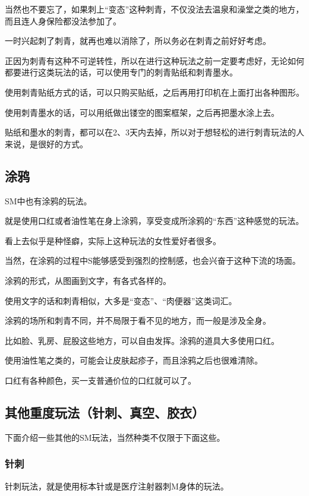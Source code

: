 \documentclass[12pt,UTF8]{ctexbook}
\begin{document}
当然也不要忘了，如果刺上“变态”这种刺青，不仅没法去温泉和澡堂之类的地方，而且连人身保险都没法参加了。

一时兴起刺了刺青，就再也难以消除了，所以务必在刺青之前好好考虑。

正因为刺青有这种不可逆转性，所以在进行这种玩法之前一定要考虑好，无论如何都要进行这类玩法的话，可以使用专门的刺青贴纸和刺青墨水。

使用刺青贴纸方式的话，可以只购买贴纸，之后再用打印机在上面打出各种图形。

使用刺青墨水的话，可以用纸做出镂空的图案框架，之后再把墨水涂上去。

贴纸和墨水的刺青，都可以在2、3天内去掉，所以对于想轻松的进行刺青玩法的人来说，是很好的方式。

\subsection{涂鸦}

SM中也有涂鸦的玩法。

就是使用口红或者油性笔在身上涂鸦，享受变成所涂鸦的“东西”这种感觉的玩法。

看上去似乎是种怪癖，实际上这种玩法的女性爱好者很多。

当然，在涂鸦的过程中S能够感受到强烈的控制感，也会兴奋于这种下流的场面。

涂鸦的形式，从图画到文字，有各式各样的。

使用文字的话和刺青相似，大多是“变态”、“肉便器”这类词汇。

涂鸦的场所和刺青不同，并不局限于看不见的地方，而一般是涉及全身。

比如脸、乳房、屁股这些地方，可以自由发挥。涂鸦的道具大多使用口红。

使用油性笔之类的，可能会让皮肤起疹子，而且涂鸦之后也很难清除。

口红有各种颜色，买一支普通价位的口红就可以了。

\subsection{其他重度玩法（针刺、真空、胶衣）}

下面介绍一些其他的SM玩法，当然种类不仅限于下面这些。 

\subsubsection{针刺}

针刺玩法，就是使用标本针或是医疗注射器刺M身体的玩法。
\end{document}
